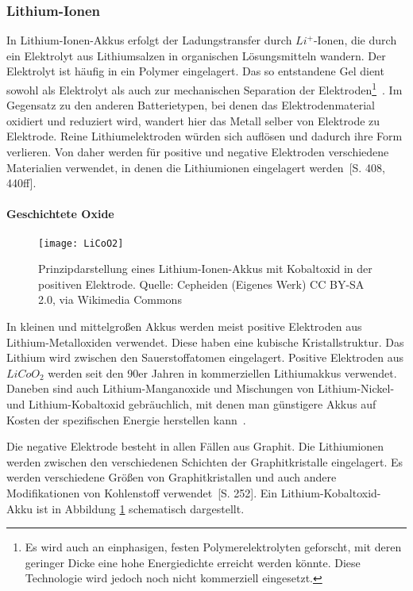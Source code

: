 \subsubsection{Lithium-Ionen}
In Lithium-Ionen-Akkus erfolgt der Ladungstransfer durch $Li^+$-Ionen, die durch ein Elektrolyt aus Lithiumsalzen in organischen Lösungsmitteln wandern. Der Elektrolyt ist häufig in ein Polymer eingelagert. Das so entstandene Gel dient sowohl als Elektrolyt als auch zur mechanischen Separation der Elektroden\footnote{Es wird auch an einphasigen, festen Polymerelektrolyten geforscht, mit deren geringer Dicke eine hohe Energiedichte erreicht werden könnte. Diese Technologie wird jedoch noch nicht kommerziell eingesetzt.}~\cite{xu2004nonaqueous}. Im Gegensatz zu den anderen Batterietypen, bei denen das Elektrodenmaterial oxidiert und reduziert wird, wandert hier das Metall selber von Elektrode zu Elektrode. Reine Lithiumelektroden würden sich auflösen und dadurch ihre Form verlieren. Von daher werden für positive und negative Elektroden verschiedene Materialien verwendet, in denen die Lithiumionen eingelagert werden~\cite{KiehneBattery}[S. 408, 440ff]. 

\paragraph{Geschichtete Oxide}

\begin{figure}\centering
	\texttt{[image: LiCoO2]}
	\caption[Prinzipdarstellung eines Lithium-Ionen-Akkus]{Prinzipdarstellung eines Lithium-Ionen-Akkus mit Kobaltoxid in der positiven Elektrode. Quelle: Cepheiden (Eigenes Werk) CC BY-SA 2.0, via Wikimedia Commons} %
	\label{abb_LiCoO2}
\end{figure}

In kleinen und mittelgroßen Akkus werden meist positive Elektroden aus Lithium-Metalloxiden verwendet. Diese haben eine kubische Kristallstruktur. Das Lithium wird zwischen den Sauerstoffatomen eingelagert. Positive Elektroden aus $LiCoO_2$ werden seit den 90er Jahren in kommerziellen Lithiumakkus verwendet. Daneben sind auch Lithium-Manganoxide und Mischungen von Lithium-Nickel- und Lithium-Kobaltoxid gebräuchlich, mit denen man günstigere Akkus auf Kosten der spezifischen Energie herstellen kann~\cite{whittingham2004lithium}. %

Die negative Elektrode besteht in allen Fällen aus Graphit. Die Lithiumionen werden zwischen den verschiedenen Schichten der Graphitkristalle eingelagert. Es werden verschiedene Größen von Graphitkristallen und auch andere Modifikationen von Kohlenstoff verwendet~\cite{Sterner:2014}[S. 252]. Ein Lithium-Kobaltoxid-Akku ist in Abbildung \ref{abb_LiCoO2} schematisch dargestellt.


